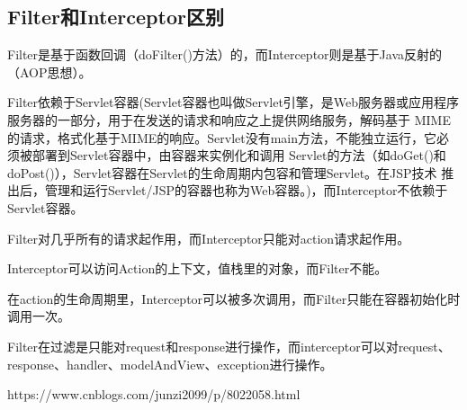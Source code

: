 \documentclass[../../../interview-questions.tex]{subfiles}
\begin{document}
\subsection{Filter和Interceptor区别}

Filter是基于函数回调（doFilter()方法）的，而Interceptor则是基于Java反射的（AOP思想）。

Filter依赖于Servlet容器(Servlet容器也叫做Servlet引擎，是Web服务器或应用程序服务器的一部分，用于在发送的请求和响应之上提供网络服务，解码基于 MIME的请求，格式化基于MIME的响应。Servlet没有main方法，不能独立运行，它必须被部署到Servlet容器中，由容器来实例化和调用 Servlet的方法（如doGet()和doPost()），Servlet容器在Servlet的生命周期内包容和管理Servlet。在JSP技术 推出后，管理和运行Servlet/JSP的容器也称为Web容器。)，而Interceptor不依赖于Servlet容器。

Filter对几乎所有的请求起作用，而Interceptor只能对action请求起作用。

Interceptor可以访问Action的上下文，值栈里的对象，而Filter不能。

在action的生命周期里，Interceptor可以被多次调用，而Filter只能在容器初始化时调用一次。

Filter在过滤是只能对request和response进行操作，而interceptor可以对request、response、handler、modelAndView、exception进行操作。

https://www.cnblogs.com/junzi2099/p/8022058.html
\end{document}
